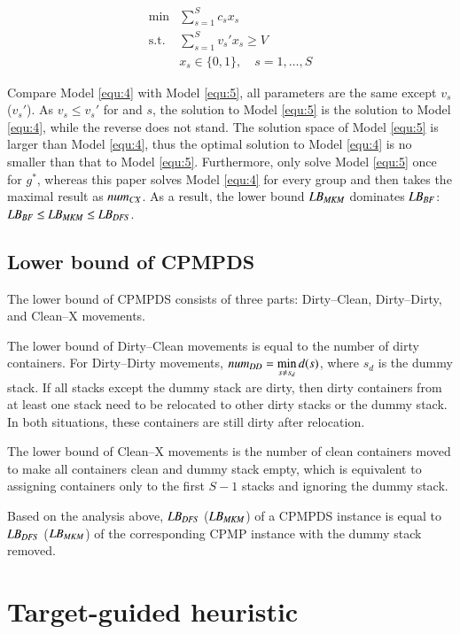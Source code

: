 \documentclass[review,3p,times,authoryear,12pt]{elsarticle}
\begin{document}
\begin{equation}
\label{equ:5}
\begin{array}{rl}
\min & \sum\limits_{s=1}^S c_s x_s\\
\mathrm{s.t.} &\sum\limits_{s=1}^S v_s' x_s\ge V\\
&x_s\in\{0,1\}, \quad s=1,\dots,S
\end{array}
\end{equation}

Compare Model \ref{equ:4} with Model \ref{equ:5}, all parameters are the same except $v_s$ ($v_s'$). As $v_s\le v_s'$ for and $s$, the solution to Model \ref{equ:5} is the solution to Model \ref{equ:4}, while the reverse does not stand. The solution space of Model \ref{equ:5} is larger than Model \ref{equ:4}, thus the optimal solution to Model \ref{equ:4} is no smaller than that to Model \ref{equ:5}. Furthermore, \cite{BF2012} only solve Model \ref{equ:5} once for $g^*$, whereas this paper solves Model \ref{equ:4} for every group and then takes the maximal result as $\id{num}_\id{CX}$. As a result, the lower bound $\id{LB}_\id{MKM}$ dominates $\id{LB}_\id{BF}$: $\id{LB}_\id{BF}\le \id{LB}_\id{MKM}\le \id{LB}_\id{DFS}$.
\subsection{Lower bound of CPMPDS}

The lower bound of CPMPDS consists of three parts: Dirty--Clean, Dirty--Dirty, and Clean--X movements.

The lower bound of Dirty--Clean movements is equal to the number of dirty containers. For Dirty--Dirty movements, $\id{num}_\id{DD}=\min\limits_{s\neq s_d} d(s)$, where $s_d$ is the dummy stack. If all stacks except the dummy stack are dirty, then dirty containers from at least one stack need to be relocated to other dirty stacks or the dummy stack. In both situations, these containers are still dirty after relocation.

The lower bound of Clean--X movements is the number of clean containers moved to make all containers clean and dummy stack empty, which is equivalent to assigning containers only to the first $S-1$ stacks and ignoring the dummy stack.

Based on the analysis above, $\id{LB}_\id{DFS}$ ($\id{LB}_\id{MKM}$) of a CPMPDS instance is equal to $\id{LB}_\id{DFS}$ ($\id{LB}_\id{MKM}$) of the corresponding CPMP instance with the dummy stack removed.

\section{Target-guided heuristic}
\label{sec:heu}
\end{document}

